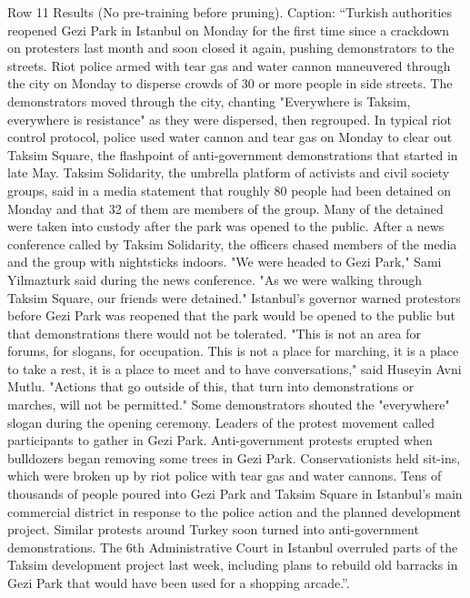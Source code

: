\begin{table}[H]
\centering
\caption{Row 11 Results (No pre-training before pruning). \ifshowcaption{}Caption: ``Turkish authorities reopened Gezi Park in Istanbul on Monday for the first time since a crackdown on protesters last month and soon closed it again, pushing demonstrators to the streets. Riot police armed with tear gas and water cannon maneuvered through the city on Monday to disperse crowds of 30 or more people in side streets. The demonstrators moved through the city, chanting "Everywhere is Taksim, everywhere is resistance" as they were dispersed, then regrouped. In typical riot control protocol, police used water cannon and tear gas on Monday to clear out Taksim Square, the flashpoint of anti-government demonstrations that started in late May. Taksim Solidarity, the umbrella platform of activists and civil society groups, said in a media statement that roughly 80 people had been detained on Monday and that 32 of them are members of the group. Many of the detained were taken into custody after the park was opened to the public. After a news conference called by Taksim Solidarity, the officers chased members of the media and the group with nightsticks indoors. "We were headed to Gezi Park," Sami Yilmazturk said during the news conference. "As we were walking through Taksim Square, our friends were detained." Istanbul's governor warned protestors before Gezi Park was reopened that the park would be opened to the public but that demonstrations there would not be tolerated. "This is not an area for forums, for slogans, for occupation. This is not a place for marching, it is a place to take a rest, it is a place to meet and to have conversations," said Huseyin Avni Mutlu. "Actions that go outside of this, that turn into demonstrations or marches, will not be permitted." Some demonstrators shouted the "everywhere" slogan during the opening ceremony. Leaders of the protest movement called participants to gather in Gezi Park. Anti-government protests erupted when bulldozers began removing some trees in Gezi Park. Conservationists held sit-ins, which were broken up by riot police with tear gas and water cannons. Tens of thousands of people poured into Gezi Park and Taksim Square in Istanbul's main commercial district in response to the police action and the planned development project. Similar protests around Turkey soon turned into anti-government demonstrations. The 6th Administrative Court in Istanbul overruled parts of the Taksim development project last week, including plans to rebuild old barracks in Gezi Park that would have been used for a shopping arcade.''.\fi}

\end{table}

